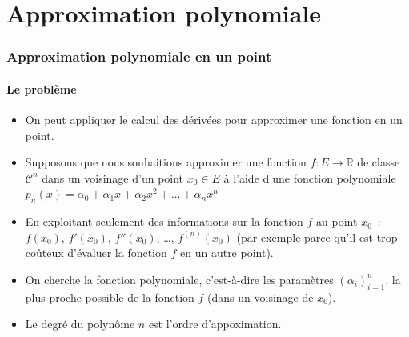 \documentclass[10pt,notheorems]{beamer}
\theoremstyle{plain}
\theoremstyle{definition} %
\begin{document}
\section{Approximation polynomiale}

\begin{frame}
  \frametitle{Approximation polynomiale en un point}
  \framesubtitle{Le problème}
  \hypertarget{slide_taylor_1}{}

  \begin{itemize}

  \item On peut appliquer le calcul des dérivées pour approximer une fonction en un point.\newline

  \item Supposons que nous souhaitions approximer une fonction $f: E\rightarrow \mathbb R$ de classe $\mathcal C^n$ dans un voisinage d'un point $x_0\in E$ à l'aide d'une fonction polynomiale $p_n(x) = \alpha_0+\alpha_1x+\alpha_2x^2+\ldots+\alpha_nx^n$\newline

  \item En exploitant seulement des informations sur la fonction $f$ au point $x_0$~: $f(x_0)$, $f'(x_0)$, $f''(x_0)$, \ldots, $f^{(n)}(x_0)$ (par exemple parce qu'il est trop coûteux d'évaluer la fonction $f$ en un autre point).\newline

  \item On cherche la fonction polynomiale, c'est-à-dire les paramètres $(\alpha_i)_{i=1}^n$, la plus proche possible de la fonction $f$ (dans un voisinage de $x_0$).\newline

  \item Le degré du polynôme $n$ est l'ordre d'appoximation.

  \end{itemize}

\end{frame}
\end{document}
